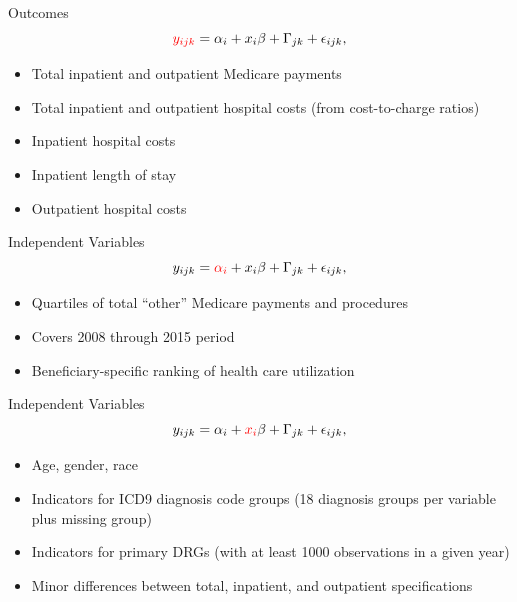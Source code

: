 \documentclass[t,aspectratio=169]{beamer}
\begin{document}
\begin{frame}{Outcomes}
    \begin{equation*}
        \textcolor{red}{y_{ijk}} = \alpha_{i} + x_{i}\beta + \Gamma_{jk} + \epsilon_{ijk},
    \end{equation*}

    \begin{itemize}
        \item Total inpatient and outpatient Medicare payments
        \item Total inpatient and outpatient hospital costs (from cost-to-charge ratios)
        \item Inpatient hospital costs
        \item Inpatient length of stay
        \item Outpatient hospital costs
    \end{itemize}
\end{frame}


\begin{frame}{Independent Variables}
    \begin{equation*}
        y_{ijk} = \textcolor{red}{\alpha_{i}} + x_{i}\beta + \Gamma_{jk} + \epsilon_{ijk},
    \end{equation*}

    \begin{itemize}
        \item Quartiles of total ``other'' Medicare payments and procedures
        \item Covers 2008 through 2015 period
        \item Beneficiary-specific ranking of health care utilization
    \end{itemize}
\end{frame}

\begin{frame}{Independent Variables}
    \begin{equation*}
        y_{ijk} = \alpha_{i} + \textcolor{red}{x_{i}}\beta + \Gamma_{jk} + \epsilon_{ijk},
    \end{equation*}

    \begin{itemize}
        \item Age, gender, race
        \item Indicators for ICD9 diagnosis code groups (18 diagnosis groups per variable plus missing group)
        \item Indicators for primary DRGs (with at least 1000 observations in a given year)
        \item Minor differences between total, inpatient, and outpatient specifications
    \end{itemize}
\end{frame}
\end{document}
